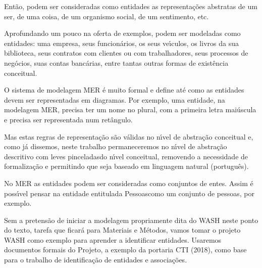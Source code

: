 \documentclass[
12pt,		%
openright,	%
twoside,  %
a4paper,			%
chapter=TITLE,		%
english,			%
french,				%
spanish,			%
brazil				%
]{USPSC-classe/USPSC}
\begin{document}
Ent\~ao, podem ser consideradas como entidades as representa\c{c}\~oes abstratas de um ser, de uma coisa, de um organismo social, de um sentimento, etc.










Aprofundando um pouco na oferta de exemplos, podem ser modeladas como entidades: uma empresa, seus funcion\'arios, os seus ve\'{\i}culos, os livros da sua biblioteca, seus contratos com clientes ou com trabalhadores, seus processos de neg\'ocios, suas contas banc\'arias, entre tantas outras formas de exist\^encia conceitual.










O sistema de modelagem MER \'e muito formal e define at\'e como as entidades devem ser representadas em diagramas. Por exemplo, uma entidade, na modelagem MER, precisa ter um nome no plural, com a primeira letra mai\'uscula e precisa ser representada num ret\^angulo.










Mas estas regras de representa\c{c}\~ao s\~ao v\'alidas no n\'{\i}vel de abstra\c{c}\~ao conceitual e, como j\'a dissemos, neste trabalho permaneceremos no n\'{\i}vel de abstra\c{c}\~ao descritivo com \textquotedbl leves pinceladas\textquotedbl  do n\'{\i}vel conceitual, removendo a necessidade de formaliza\c{c}\~ao e permitindo que seja baseado em linguagem natural (portugu\^es).










No MER as entidades podem ser consideradas como conjuntos de entes. Assim \'e poss\'{\i}vel pensar na entidade entitulada \textquotedbl Pessoas\textquotedbl  como um conjunto de pessoas, por exemplo.










Sem a pretens\~ao de iniciar a modelagem propriamente dita do WASH neste ponto do texto, tarefa que ficar\'a para Materiais e M\'etodos, vamos tomar o projeto WASH como exemplo para aprender a identificar entidades. Usaremos documentos formais do Projeto, a exemplo da portaria CTI (2018), como base para o trabalho de identifica\c{c}\~ao de entidades e associa\c{c}\~oes.
\end{document}
